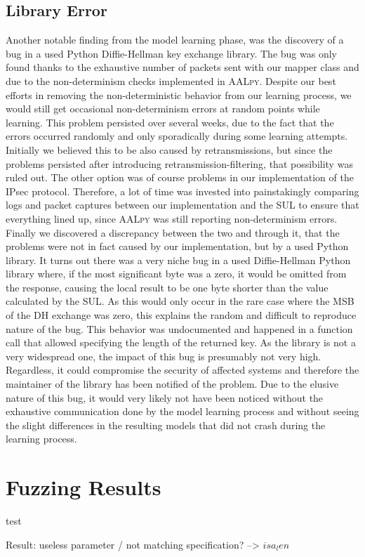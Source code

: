 \subsection{Library Error} \label{subsec:liberror}
Another notable finding from the model learning phase, was the discovery of a bug in a used Python Diffie-Hellman key exchange library. The bug was only found thanks to the exhaustive number of packets sent with our mapper class and due to the non-determinism checks implemented in \textsc{AALpy}. Despite our best efforts in removing the non-deterministic behavior from our learning process, we would still get occasional non-determinism errors at random points while learning. This problem persisted over several weeks, due to the fact that the errors occurred randomly and only sporadically during some learning attempts. Initially we believed this to be also caused by retransmissions, but since the problems persisted after introducing retransmission-filtering, that possibility was ruled out. The other option was of course problems in our implementation of the IPsec protocol. Therefore, a lot of time was invested into painstakingly comparing logs and packet captures between our implementation and the SUL to ensure that everything lined up, since \textsc{AALpy} was still reporting non-determinism errors. Finally we discovered a discrepancy between the two and through it, that the problems were not in fact caused by our implementation, but by a used Python library. It turns out there was a very niche bug in a used Diffie-Hellman Python library where, if the most significant byte was a zero, it would be omitted from the response, causing the local result to be one byte shorter than the value calculated by the SUL. As this would only occur in the rare case where the MSB of the DH exchange was zero, this explains the random and difficult to reproduce nature of the bug. This behavior was undocumented and happened in a function call that allowed specifying the length of the returned key. As the library is not a very widespread one, the impact of this bug is presumably not very high. Regardless, it could compromise the security of affected systems and therefore the maintainer of the library has been notified of the problem. Due to the elusive nature of this bug, it would very likely not have been noticed without the exhaustive communication done by the model learning process and without seeing the slight differences in the resulting models that did not crash during the learning process.

\section{Fuzzing Results} \label{subsec:fuzzresults}
test

Result: useless parameter / not matching specification? --> $isa_len$